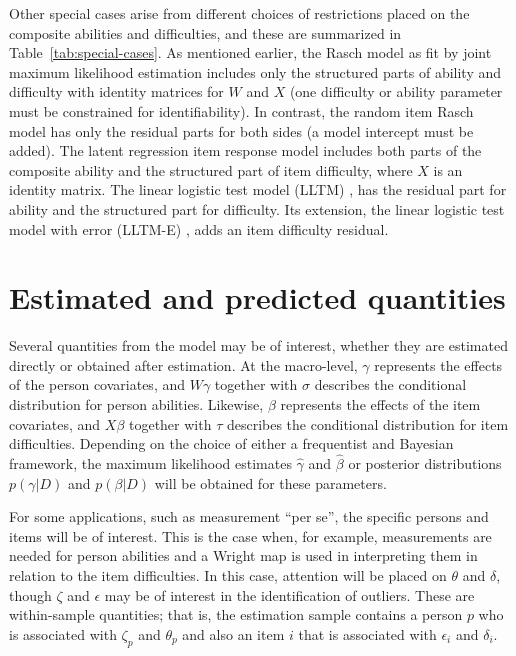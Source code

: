 \documentclass[12pt, letterpaper]{article}
\begin{document}
Other special cases arise from different choices of restrictions placed on the composite abilities and difficulties, and these are summarized in Table~\ref{tab:special-cases}. As mentioned earlier, the Rasch model as fit by joint maximum likelihood estimation \parencite[for example,][]{embretson2000item} includes only the structured parts of ability and difficulty with identity matrices for $W$ and $X$ (one difficulty or ability parameter must be constrained for identifiability). In contrast, the random item Rasch model \parencite[for example,][]{DeBoeck2008} has only the residual parts for both sides (a model intercept must be added). The latent regression item response model \parencite{mislevy1985estimation, adams1997multilevel} includes both parts of the composite ability and the structured part of item difficulty, where $X$ is an identity matrix. The linear logistic test model (LLTM) \parencite{fischer1973linear}, has the residual part for ability and the structured part for difficulty. Its extension, the linear logistic test model with error (LLTM-E) \parencite[for example,][]{mislevy1988exploiting, Janssen2004}, adds an item difficulty residual.


\section{Estimated and predicted quantities}

Several quantities from the model may be of interest, whether they are estimated directly or obtained after estimation. At the macro-level, $\gamma$ represents the effects of the person covariates, and $W \gamma$ together with $\sigma$ describes the conditional distribution for person abilities. Likewise, $\beta$ represents the effects of the item covariates, and $X \beta$ together with $\tau$ describes the conditional distribution for item difficulties. Depending on the choice of either a frequentist and Bayesian framework, the maximum likelihood estimates $\hat \gamma$ and $\hat \beta$ or posterior distributions $p(\gamma | D)$ and $p(\beta | D)$ will be obtained for these parameters.

For some applications, such as measurement ``per se'', the specific persons and items will be of interest. This is the case when, for example, measurements are needed for person abilities and a Wright map \parencite{wilson2004constructing} is used in interpreting them in relation to the item difficulties. In this case, attention will be placed on $\theta$ and $\delta$, though $\zeta$ and $\epsilon$ may be of interest in the identification of outliers. These are within-sample quantities; that is, the estimation sample contains a person $p$ who is associated with $\zeta_p$ and $\theta_p$ and also an item $i$ that is associated with $\epsilon_i$ and $\delta_i$.
\end{document}
